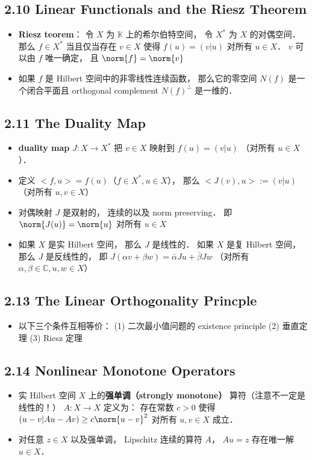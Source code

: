 \subsection{2.10 Linear Functionals and the Riesz Theorem}
\begin{itemize}
\item \textbf{Riesz teorem}： 令 $X$ 为 $\mathbb K$ 上的希尔伯特空间， 令 $X^*$ 为 $X$ 的对偶空间． 那么 $f\in X^*$ 当且仅当存在 $v\in X$ 使得 $f(u) = (v|u)$ 对所有 $u\in X$． $v$ 可以由 $f$ 唯一确定， 且 $\norm{f} = \norm{v}$

\item 如果 $f$ 是 Hilbert 空间中的非零线性连续函数， 那么它的零空间 $N(f)$ 是一个闭合平面且 orthogonal complement $N(f)^\bot$ 是一维的．
\end{itemize}

\subsection{2.11 The Duality Map}
\begin{itemize}
\item \textbf{duality map} $J: X\to X^*$ 把 $v\in X$ 映射到 $f(u) = (v|u)$ （对所有 $u\in X$）．

\item 定义 $<f, u> = f(u)$（$f\in X^*, u\in X$）， 那么 $<J(v), u> := (v|u)$ （对所有 $u, v\in X$）

\item 对偶映射 $J$ 是双射的， 连续的以及 norm preserving． 即 $\norm{J(u)} = \norm{u}$ 对所有 $u\in X$

\item 如果 $X$ 是实 Hilbert 空间， 那么 $J$ 是线性的． 如果 $X$ 是复 Hilbert 空间， 那么 $J$ 是反线性的， 即 $J(\alpha v + \beta w) = \bar \alpha Ju + \bar \beta Jw$ （对所有 $\alpha,\beta\in\mathbb C, u, w\in X$）
\end{itemize}

\subsection{2.13 The Linear Orthogonality Princple}
\begin{itemize}
\item 以下三个条件互相等价： (1) 二次最小值问题的 existence principle (2) 垂直定理 (3) Riesz 定理
\end{itemize}

\subsection{2.14 Nonlinear Monotone Operators}
\begin{itemize}
\item 实 Hilbert 空间 $X$ 上的\textbf{强单调（strongly monotone）} 算符（注意不一定是线性的！） $A:X\to X$ 定义为： 存在常数 $c > 0$ 使得 $(u-v|Au - Av) \ge c\norm{u-v}^2$ 对所有 $u, v\in X$ 成立．

\item 对任意 $z \in X$ 以及强单调， Lipschitz 连续的算符 $A$， $Au = z$ 存在唯一解 $u\in X$．
\end{itemize}

